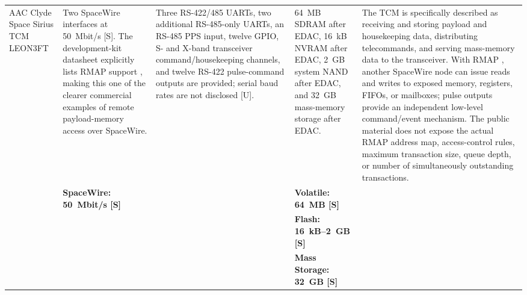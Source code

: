 \documentclass[10pt]{../datasheet}
\let\cite\citep
\begin{document}
\begin{landscape}
\begin{longtable}{|p{3.2cm}|p{4.5cm}|p{4.5cm}|p{4.5cm}|p{5.5cm}|}
    AAC Clyde Space Sirius TCM LEON3FT \cite{aac_sirius_tcm_ds,
    aac_sirius_tcm_kit_ds, ecss_rmap_std}                              &
    Two SpaceWire interfaces at 50~Mbit/s [S]. The development-kit datasheet
    explicitly lists RMAP support \cite{ecss_rmap_std}, making this one of the
    clearer commercial examples of remote payload-memory access over SpaceWire.
                                                                       & Three RS-422/485 UARTs, two additional RS-485-only UARTs, an RS-485 PPS
    input, twelve GPIO, S- and X-band transceiver command/housekeeping channels,
    and twelve RS-422 pulse-command outputs are provided; serial baud rates are
    not disclosed [U].                                                 & 64~MB SDRAM after EDAC, 16~kB NVRAM after EDAC, 2~GB
    system NAND after EDAC, and 32~GB mass-memory storage after EDAC.
                                                                       & The TCM is specifically described as receiving and storing payload and
    housekeeping data, distributing telecommands, and serving mass-memory data
    to the transceiver. With RMAP \cite{ecss_rmap_std}, another SpaceWire node
    can issue reads and writes to exposed memory, registers, FIFOs, or
    mailboxes; pulse outputs provide an independent low-level command/event
    mechanism. The public material does not expose the actual RMAP address map,
    access-control rules, maximum transaction size, queue depth, or number of
    simultaneously outstanding transactions.
    \\
    \cline{2-5}
                                                                       & \textbf{SpaceWire: 50~Mbit/s [S]}
                                                                       &
                                                                       & \textbf{Volatile: 64~MB [S]}                                               &                                                                                                \\
                                                                       &                                                                            &                                                  & \textbf{Flash: 16~kB--2~GB [S]}           & \\
                                                                       &                                                                            &                                                  & \textbf{Mass Storage: 32~GB [S]}          & \\ \hline\hline


\end{longtable}
\end{landscape}
\end{document}
